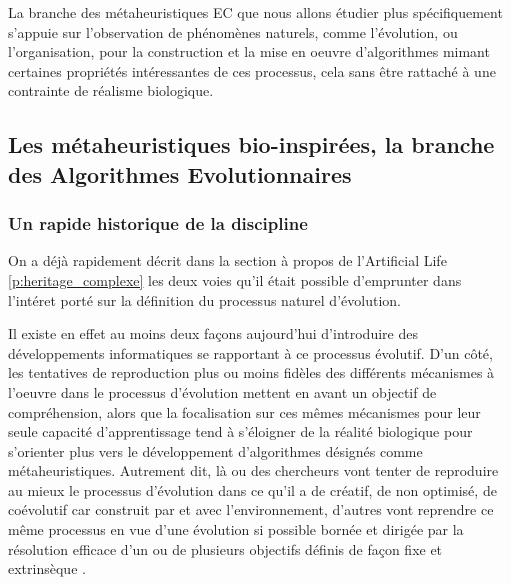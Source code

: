 
La branche des métaheuristiques EC que nous allons étudier plus spécifiquement s'appuie sur l'observation de phénomènes naturels, comme l'évolution, ou l'organisation, pour la construction et la mise en oeuvre d'algorithmes mimant certaines propriétés intéressantes de ces processus, cela sans être rattaché à une contrainte de réalisme biologique.

\subsection{Les métaheuristiques bio-inspirées, la branche des Algorithmes Evolutionnaires}
\label{ssec:EA}

\subsubsection{Un rapide historique de la discipline}
\label{sssec:historique_EA}

On a déjà rapidement décrit dans la section à propos de l'Artificial Life \ref{p:heritage_complexe} les deux voies qu'il était possible d'emprunter dans l'intéret porté sur la définition du processus naturel d'évolution.

Il existe en effet au moins deux façons aujourd'hui d'introduire des développements informatiques se rapportant à ce processus évolutif. D'un côté, les tentatives de reproduction plus ou moins fidèles des différents mécanismes à l'oeuvre dans le processus d'évolution mettent en avant un objectif de compréhension, alors que la focalisation sur ces mêmes mécanismes pour leur seule capacité d'apprentissage tend à s'éloigner de la réalité biologique pour s'orienter plus vers le développement d'algorithmes désignés comme métaheuristiques. Autrement dit, là ou des chercheurs vont tenter de reproduire au mieux le processus d'évolution dans ce qu'il a de créatif, de non optimisé, de coévolutif car construit par  et avec l'environnement, d'autres vont reprendre ce même processus en vue d'une évolution si possible bornée et dirigée par la résolution efficace d'un ou de plusieurs objectifs définis de façon fixe et extrinsèque \autocites{Taylor2001, Taylor2012}.

